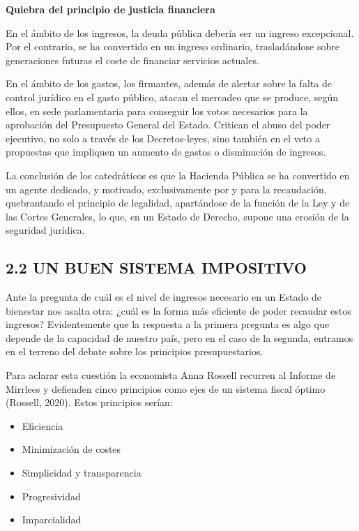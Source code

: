 \documentclass[
]{article}
\begin{document}
\textbf{Quiebra del principio de justicia financiera}

En el ámbito de los ingresos, la deuda pública debería ser un ingreso
excepcional. Por el contrario, se ha convertido en un ingreso ordinario,
trasladándose sobre generaciones futuras el coste de financiar servicios
actuales.

En el ámbito de los gastos, los firmantes, además de alertar sobre la
falta de control jurídico en el gasto público, atacan el mercadeo que se
produce, según ellos, en sede parlamentaria para conseguir los votos
necesarios para la aprobación del Presupuesto General del Estado.
Critican el abuso del poder ejecutivo, no solo a través de los
Decretos-leyes, sino también en el veto a propuestas que impliquen un
aumento de gastos o disminución de ingresos.

La conclusión de los catedráticos es que la Hacienda Pública se ha
convertido en un agente dedicado, y motivado, exclusivamente por y para
la recaudación, quebrantando el principio de legalidad, apartándose de
la función de la Ley y de las Cortes Generales, lo que, en un Estado de
Derecho, supone una erosión de la seguridad jurídica.

\hypertarget{un-buen-sistema-impositivo}{%
\subsection*{2.2 UN BUEN SISTEMA
IMPOSITIVO}\label{un-buen-sistema-impositivo}}

Ante la pregunta de cuál es el nivel de ingresos necesario en un Estado
de bienestar nos asalta otra: ¿cuál es la forma más eficiente de poder
recaudar estos ingresos? Evidentemente que la respuesta a la primera
pregunta es algo que depende de la capacidad de nuestro país, pero en el
caso de la segunda, entramos en el terreno del debate sobre los
principios presupuestarios.

Para aclarar esta cuestión la economista Anna Rossell recurren al
Informe de Mirrlees y defienden cinco principios como ejes de un sistema
fiscal óptimo (Rossell, 2020). Estos principios serían:

\begin{itemize}
\item
  Eficiencia
\item
  Minimización de costes
\item
  Simplicidad y transparencia
\item
  Progresividad
\item
  Imparcialidad
\end{itemize}
\end{document}
